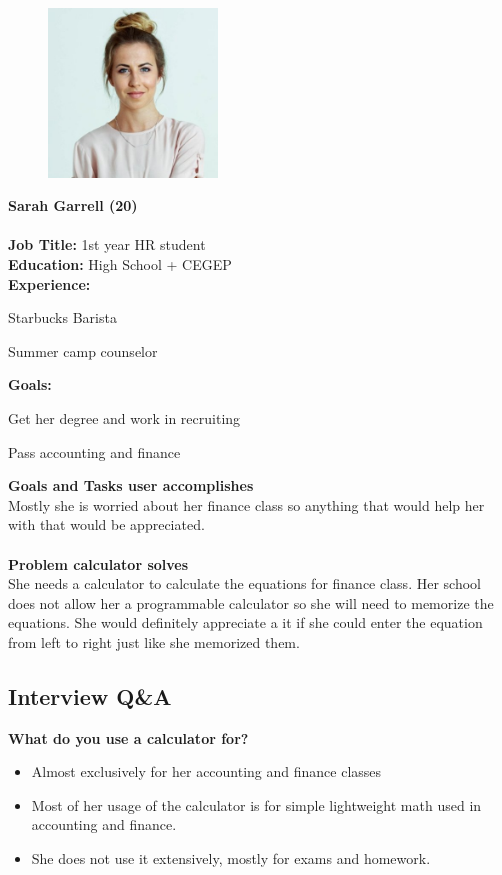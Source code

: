 \documentclass{article}
\begin{document}
\begin{figure}
\includegraphics[width=0.40\textwidth]{sarah.png}
\end{figure}
\textbf{\Large Sarah Garrell (20)} \\ \\
\textbf{Job Title: }1st year HR student\\
\textbf{Education:} High School + CEGEP\\
\textbf{Experience:}
\begin{compactitem}
\item Starbucks Barista
\item Summer camp counselor
\end{compactitem}
\textbf{Goals:}
\begin{compactitem}
\item Get her degree and work in recruiting
\item Pass accounting and finance
\end{compactitem}
\bigskip 
\textbf{Goals and Tasks user accomplishes}\\
Mostly she is worried about her finance class so anything that would help her with that would be appreciated.\\ \\
\textbf{Problem calculator solves} \\
She needs a calculator to calculate the equations for finance class. Her school does not allow her a programmable calculator so she will need to memorize the equations. She would definitely appreciate a it if she could enter the equation from left to right just like she memorized them.
\pagebreak

\subsection*{Interview Q\&A}
\textbf{What do you use a calculator for?}
\begin{itemize}
\itemsep0em 
\item Almost exclusively for her accounting and finance classes
\item Most of her usage of the calculator is for simple lightweight math used in accounting and finance.
\item She does not use it extensively, mostly for exams and homework.
\end{itemize}
\end{document}
